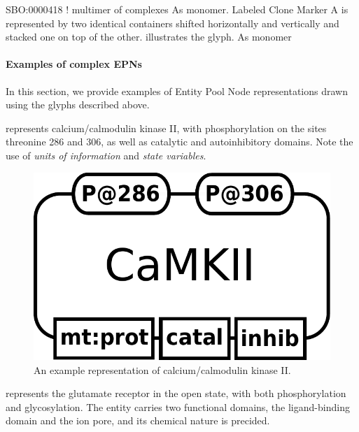  \begin{glyphDescription}
\glyphSboTerm SBO:0000418 ! multimer of complexes
\glyphAux As monomer.
\glyphCloning Labeled Clone Marker
\glyphContainer A  is represented by two
identical  containers shifted horizontally and
vertically and stacked one on top of the other.  
illustrates the glyph.
\glyphLabel As monomer
\end{glyphDescription}

\paragraph{Examples of complex EPNs}
\label{sec:CplxEPNs}

In this section, we provide examples of Entity Pool Node representations drawn using the \SBGNPDLone glyphs described above. 

 represents calcium/calmodulin kinase II, with phosphorylation on the sites threonine 286 and 306, as well as catalytic and autoinhibitory domains.  Note the use of \emph{units of information} and \emph{state variables}.

\begin{figure}[H]
  \centering
  \includegraphics[scale = 0.3]{examples/macromolecule-CaMKII}
  \caption{An example representation of calcium/calmodulin kinase II.}
  \label{fig:example-camkii}
\end{figure}

 represents the glutamate receptor in the open state, with both phosphorylation and glycosylation.  The entity carries two functional domains, the ligand-binding domain and the ion pore, and its chemical nature is precided.

